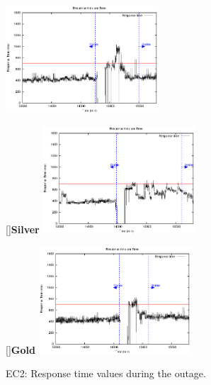 \begin{figure}[htb]
\vspace{-5mm}
	\begin{minipage}[b]{0.32\linewidth}
		\vspace{-3mm}
		\includegraphics[height=4cm]{images/exps2011/low/ec2/proxyDataPoints_output_filtered.eps}	
	\end{minipage}
	\hfill
	\begin{minipage}[b]{0.32\linewidth}
		[]{{\scriptsize \textbf{Silver}}}
		\vspace{-3mm}
		\includegraphics[height=4cm]{images/exps2011/medium/ec2/proxyDataPoints_output_filtered.eps}
	\end{minipage}
\hfill
\begin{minipage}[b]{0.32\linewidth}
		[]{{\scriptsize \textbf{Gold}}}
		\vspace{-3mm}
		\includegraphics[height=4cm]{images/exps2011/high/ec2/proxyDataPoints_output_filtered.eps}
	\end{minipage}
\vspace{-3mm}
\caption{EC2: Response time values during the outage.}
\label{fig:EC2ResponseTime}
\end{figure}


